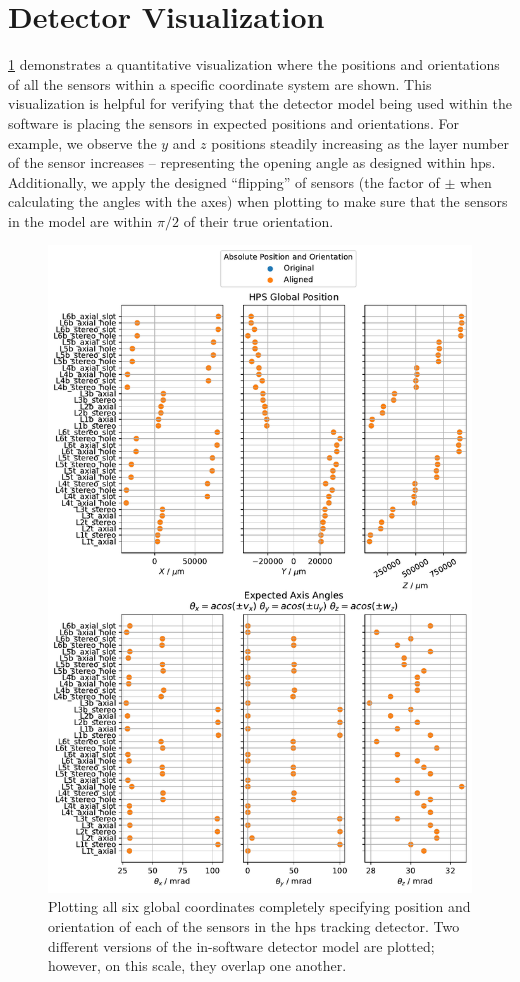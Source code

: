 \section{Detector Visualization}

\cref{fig:example-det-vis-abs} demonstrates a quantitative visualization where
the positions and orientations of all the sensors within a specific coordinate system are shown.
This visualization is helpful for verifying that the detector model being used within the software
is placing the sensors in expected positions and orientations. For example, we observe the $y$ and
$z$ positions steadily increasing as the layer number of the sensor increases -- representing the
opening angle as designed within \ac{hps}. Additionally, we apply the designed ``flipping'' of
sensors (the factor of $\pm$ when calculating the angles with the axes)
when plotting to make sure that the sensors in the model are within $\pi/2$ of their true orientation.

\begin{figure}
  \centering
  \includegraphics[height=0.85\textheight]{figures/hps/alignment/example-det-vis-abs.pdf}
  \caption{Plotting all six global coordinates completely specifying position and orientation
    of each of the sensors in the \ac{hps} tracking detector. Two different versions of the
    in-software detector model are plotted; however, on this scale, they overlap one another.}
  \label{fig:example-det-vis-abs}
\end{figure}

